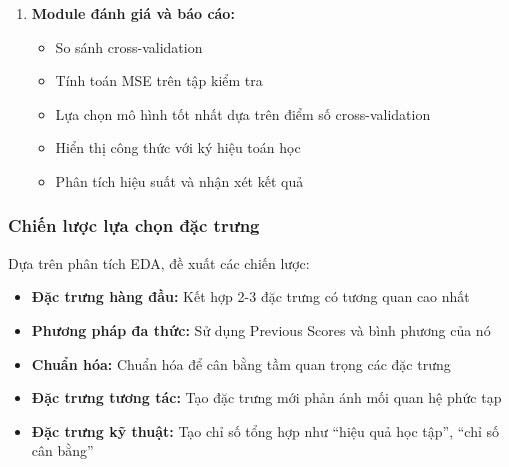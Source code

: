 \begin{enumerate}
	\item \textbf{Module đánh giá và báo cáo:}
	      \begin{itemize}
		      \item So sánh cross-validation
		      \item Tính toán MSE trên tập kiểm tra
		      \item Lựa chọn mô hình tốt nhất dựa trên điểm số cross-validation
		      \item Hiển thị công thức với ký hiệu toán học
		      \item Phân tích hiệu suất và nhận xét kết quả
	      \end{itemize}
\end{enumerate}

\subsubsection{Chiến lược lựa chọn đặc trưng}
Dựa trên phân tích EDA, đề xuất các chiến lược:
\begin{itemize}
	\item \textbf{Đặc trưng hàng đầu:} Kết hợp 2-3 đặc trưng có tương quan cao nhất
	\item \textbf{Phương pháp đa thức:} Sử dụng Previous Scores và bình phương của nó
	\item \textbf{Chuẩn hóa:} Chuẩn hóa để cân bằng tầm quan trọng các đặc trưng
	\item \textbf{Đặc trưng tương tác:} Tạo đặc trưng mới phản ánh mối quan hệ phức tạp
	\item \textbf{Đặc trưng kỹ thuật:} Tạo chỉ số tổng hợp như ``hiệu quả học tập'', ``chỉ số cân bằng''
\end{itemize}
